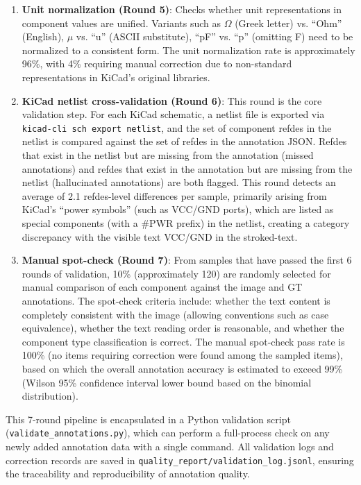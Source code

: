 \begin{enumerate}[nosep]
    \item \textbf{Unit normalization (Round 5)}: Checks whether unit representations in component values are unified. Variants such as $\Omega$ (Greek letter) vs. ``Ohm'' (English), $\mu$ vs. ``u'' (ASCII substitute), ``pF'' vs. ``p'' (omitting F) need to be normalized to a consistent form. The unit normalization rate is approximately 96\%, with 4\% requiring manual correction due to non-standard representations in KiCad's original libraries.
    \item \textbf{KiCad netlist cross-validation (Round 6)}: This round is the core validation step. For each KiCad schematic, a netlist file is exported via \texttt{kicad-cli sch export netlist}, and the set of component refdes in the netlist is compared against the set of refdes in the annotation JSON. Refdes that exist in the netlist but are missing from the annotation (missed annotations) and refdes that exist in the annotation but are missing from the netlist (hallucinated annotations) are both flagged. This round detects an average of 2.1 refdes-level differences per sample, primarily arising from KiCad's ``power symbols'' (such as VCC/GND ports), which are listed as special components (with a \#PWR prefix) in the netlist, creating a category discrepancy with the visible text VCC/GND in the stroked-text.
    \item \textbf{Manual spot-check (Round 7)}: From samples that have passed the first 6 rounds of validation, 10\% (approximately 120) are randomly selected for manual comparison of each component against the image and GT annotations. The spot-check criteria include: whether the text content is completely consistent with the image (allowing conventions such as case equivalence), whether the text reading order is reasonable, and whether the component type classification is correct. The manual spot-check pass rate is 100\% (no items requiring correction were found among the sampled items), based on which the overall annotation accuracy is estimated to exceed 99\% (Wilson 95\% confidence interval lower bound based on the binomial distribution).
\end{enumerate}

This 7-round pipeline is encapsulated in a Python validation script (\texttt{validate\_annotations.py}), which can perform a full-process check on any newly added annotation data with a single command. All validation logs and correction records are saved in \texttt{quality\_report/validation\_log.jsonl}, ensuring the traceability and reproducibility of annotation quality.

